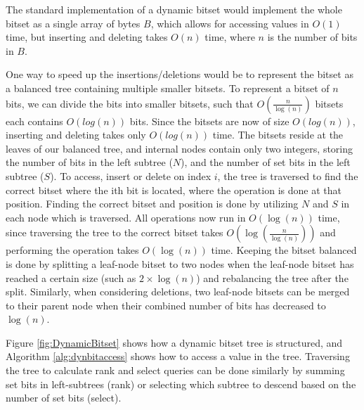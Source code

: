 The standard implementation of a dynamic bitset would implement the whole bitset as a
single array of bytes $B$, which allows for accessing values in $O(1)$ time, but inserting
and deleting takes $O(n)$ time, where $n$ is the number of bits in $B$.

One way to speed up the insertions/deletions would be to represent the bitset as a
balanced tree containing multiple smaller bitsets. To represent a bitset of $n$ bits, we
can divide the bits into smaller bitsets, such that $O(\frac{n}{\log(n)})$ bitsets each
contains $O(log(n))$ bits. Since the bitsets are now of size $O(log(n))$, inserting and
deleting takes only $O(log(n))$ time. The bitsets reside at the leaves of our balanced
tree, and internal nodes contain only two integers, storing the number of bits in the left
subtree ($N$), and the number of set bits in the left subtree ($S$). To access, insert or
delete on index $i$, the tree is traversed to find the correct bitset where the ith bit is
located, where the operation is done at that position. Finding the correct bitset and
position is done by utilizing $N$ and $S$ in each node which is traversed. All operations
now run in $O(\log(n))$ time, since traversing the tree to the correct bitset takes
$O(\log(\frac{n}{\log(n)}))$ and performing the operation takes $O(\log(n))$ time. Keeping
the bitset balanced is done by splitting a leaf-node bitset to two nodes when the
leaf-node bitset has reached a certain size (such as $2 \times \log(n)$) and rebalancing
the tree after the split. Similarly, when considering deletions, two leaf-node bitsets can
be merged to their parent node when their combined number of bits has decreased to
$\log(n)$.


Figure \ref{fig:DynamicBitset} shows how a dynamic bitset tree is structured, and Algorithm
\ref{alg:dynbitaccess} shows how to access a value in the tree. Traversing the
tree to calculate rank and select queries can be done similarly by summing set
bits in left-subtrees (rank) or selecting which subtree to descend based on the number of
set bits (select).

